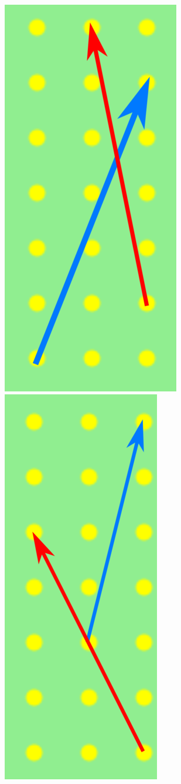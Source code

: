 \documentclass[11pt]{jarticle}
\begin{document}
\begin{figure}
  \centering
  \includegraphics[scale=0.2, natwidth=293, natheight=657]{collision.png}
  \includegraphics[scale=0.183, natwidth=288, natheight=657]{cropped.png}

\end{figure}
\end{document}
